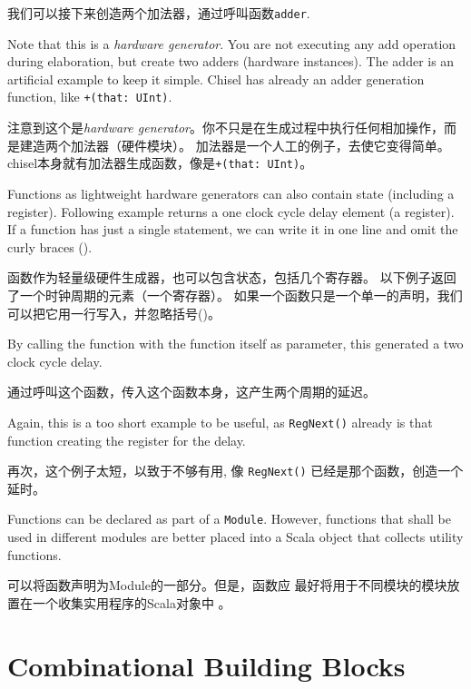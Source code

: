 \documentclass[%
    10pt,
    headinclude, footexclude,
    openright, %
    notitlepage,
    cleardoubleempty,
    headsepline,
    pointlessnumbers,
    bibtotoc, idxtotoc,
    ]{scrbook}
\newcommand{\code}[1]{{\small{\texttt{#1}}}}
\begin{document}
\noindent 我们可以接下来创造两个加法器，通过呼叫函数\code{adder}.


\noindent Note that this is a \emph{hardware generator}. You are not executing any add operation
during elaboration, but create two adders (hardware instances). The adder is an artificial example
to keep it simple. Chisel has already an adder generation function, like \code{+(that: UInt)}.

\noindent 注意到这个是\emph{hardware generator}。你不只是在生成过程中执行任何相加操作，而是建造两个加法器（硬件模块）。
加法器是一个人工的例子，去使它变得简单。chisel本身就有加法器生成函数，像是\code{+(that: UInt)}。

Functions as lightweight hardware generators can also contain state (including a register).
Following example returns a one clock cycle delay element (a register).
If a function has just a single statement, we can write it in one line and omit the curly
braces ({}).

函数作为轻量级硬件生成器，也可以包含状态，包括几个寄存器。
以下例子返回了一个时钟周期的元素（一个寄存器）。
如果一个函数只是一个单一的声明，我们可以把它用一行写入，并忽略括号({})。


\noindent By calling the function with the function itself as parameter, this generated a two
clock cycle delay.

\noindent 通过呼叫这个函数，传入这个函数本身，这产生两个周期的延迟。


\noindent Again, this is a too short example to be useful, as \code{RegNext()}
already is that function creating the register for the delay.

\noindent 再次，这个例子太短，以致于不够有用, 像 \code{RegNext()}
已经是那个函数，创造一个延时。

Functions can be declared as part of a \code{Module}. However, functions that shall be
used in different modules are better placed into a Scala object that collects utility
functions.

可以将函数声明为Module的一部分。但是，函数应
最好将用于不同模块的模块放置在一个收集实用程序的Scala对象中
。

\chapter{Combinational Building Blocks}
\end{document}
